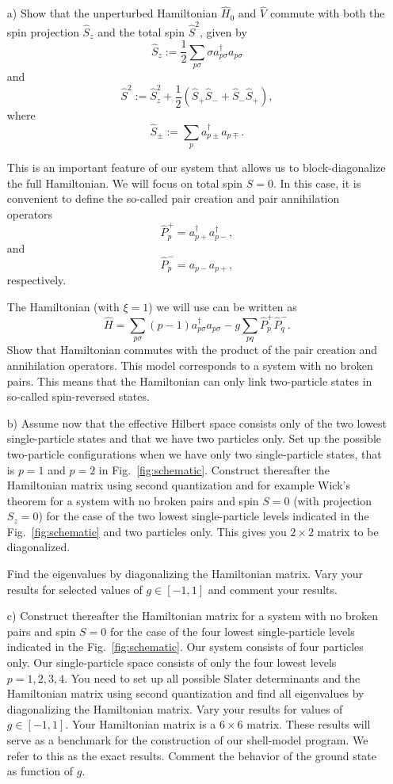 \documentclass[prc]{revtex4}
\begin{document}
\begin{enumerate}
\item[a)] Show that the  
unperturbed Hamiltonian  $\hat{H}_0$ and $\hat{V}$ commute
with both the spin projection $\hat{S}_z$ and the total spin
$\hat{S}^2$, given by
\[
  \hat{S}_z := \frac{1}{2}\sum_{p\sigma} \sigma a^\dag_{p\sigma}a_{p\sigma}
\]
and
\[
  \hat{S}^2 := \hat{S}_z^2 + \frac{1}{2}(\hat{S}_+\hat{S}_- +
  \hat{S}_-\hat{S}_+),
\]
where
\[
  \hat{S}_\pm := \sum_{p} a^\dag_{p\pm} a_{p\mp}.
\]

This is an important feature of our system that allows us to block-diagonalize
the full Hamiltonian. We will focus on total spin $S=0$.
In this case, it is convenient to define the so-called pair creation and pair
annihilation operators
\[
\hat{P}^{+}_p = a^\dag_{p+}a^\dag_{p-},
\]
and
\[
\hat{P}^{-}_p = a_{p-}a_{p+},
\] 
respectively.

The Hamiltonian (with $\xi=1$) we will use can be written as
\[
\hat{H}=\sum_{p\sigma}(p-1)a_{p\sigma}^{\dagger}a_{p\sigma}
-g\sum_{pq}\hat{P}^{+}_p\hat{P}^{-}_q.
\]
Show  that Hamiltonian commutes with the product of the pair creation and annihilation operators.
This model corresponds to a system with no broken pairs. This means that the Hamiltonian can only link two-particle states in so-called spin-reversed states. 


\item[b)] 
Assume now that the effective Hilbert space consists only of the two lowest single-particle states and that we have two particles only.
Set up the possible two-particle configurations when we have only two single-particle states, that is $p=1$ and $p=2$ in  
Fig.~\ref{fig:schematic}. 
Construct thereafter the Hamiltonian matrix using second quantization and for example Wick's theorem 
for a system with no broken pairs and spin $S=0$ (with projection $S_z=0$) for the case of the two lowest single-particle levels  
indicated in the Fig.~\ref{fig:schematic} and two particles only.  This gives you 
 $2\times 2$ matrix to be diagonalized. 

Find the eigenvalues by diagonalizing the Hamiltonian matrix.
Vary your results for selected values of $g\in [-1,1]$ and comment your results.

\item[c)] Construct thereafter the Hamiltonian matrix for a system with no broken pairs and spin $S=0$ for the case of the four lowest single-particle levels  
indicated in the Fig.~\ref{fig:schematic}. Our system consists of four particles only.
Our single-particle space consists of only the four lowest levels 
$p=1,2,3,4$.  You need to set up all possible Slater determinants and the Hamiltonian matrix using second quantization and
find all eigenvalues by diagonalizing the Hamiltonian matrix.
Vary your results for values of $g\in [-1,1]$.  Your Hamiltonian matrix is a $6\times 6$ matrix. 
These results will serve as a benchmark for the construction  of our shell-model program. 
We  refer to this as the exact results. Comment the behavior of the ground state as function of $g$. 


\end{enumerate}
\end{document}
